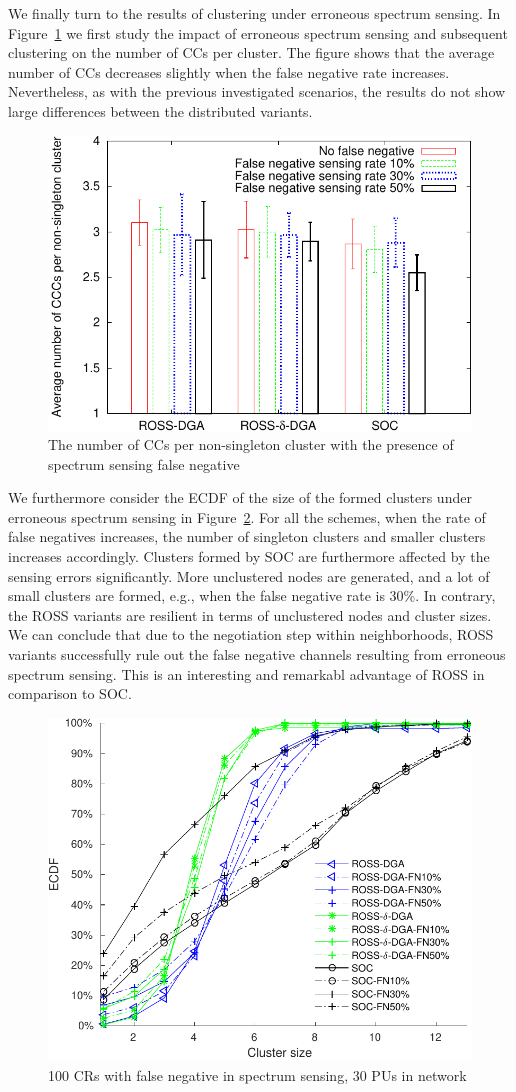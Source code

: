 \documentclass[times]{ettauth}
\newcommand{\eg}{e.g., }
\theoremstyle{mytheoremstyle}
\theoremstyle{mytheoremstyle}
\theoremstyle{mytheoremstyle}
\begin{document}
We finally turn to the results of clustering under erroneous spectrum sensing.
In Figure~\ref{false_negative_ccc} we first study the impact of erroneous spectrum sensing and subsequent clustering on the number of CCs per cluster.
The figure shows that the average number of CCs decreases slightly when the false negative rate increases.
Nevertheless, as with the previous investigated scenarios, the results do not show large differences between the distributed variants.
\begin{figure}[!h]
  \centering
   \includegraphics[width=0.7\linewidth]{false_negative.pdf}
  \caption{The number of CCs per non-singleton cluster with the presence of spectrum sensing false negative}
  \label{false_negative_ccc}
\end{figure}
We furthermore consider the ECDF of the size of the formed clusters under erroneous spectrum sensing in Figure~\ref{false_negative_CDF}.
For all the schemes, when the rate of false negatives increases, the number of singleton clusters and smaller clusters increases accordingly.
Clusters formed by SOC are furthermore affected by the sensing errors significantly.
More unclustered nodes are generated, and a lot of small clusters are formed, \eg when the false negative rate is 30\%.
In contrary, the ROSS variants are resilient in terms of unclustered nodes and cluster sizes.
We can conclude that due to the negotiation step within neighborhoods, ROSS variants successfully rule out the false negative channels resulting from erroneous spectrum sensing. 
This is an interesting and remarkabl advantage of ROSS in comparison to SOC.
\begin{figure}[!h]
  \centering
   \includegraphics[width=0.7\linewidth]{draw_cdf_clusterSize_with_false_negative.pdf}
  \caption{100 CRs with false negative in spectrum sensing, 30 PUs in network}
  \label{false_negative_CDF}
\end{figure}
\end{document}
